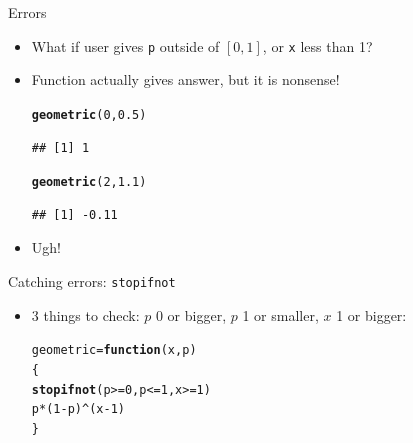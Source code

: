 \documentclass[unknownkeysallowed]{beamer}\usepackage[]{graphicx}\usepackage[]{color}
\makeatletter
\newcommand{\hlnum}[1]{\textcolor[rgb]{0.686,0.059,0.569}{#1}}%
\newcommand{\hlopt}[1]{\textcolor[rgb]{0,0,0}{#1}}%
\newcommand{\hlstd}[1]{\textcolor[rgb]{0.345,0.345,0.345}{#1}}%
\newcommand{\hlkwa}[1]{\textcolor[rgb]{0.161,0.373,0.58}{\textbf{#1}}}%
\newcommand{\hlkwb}[1]{\textcolor[rgb]{0.69,0.353,0.396}{#1}}%
\newcommand{\hlkwc}[1]{\textcolor[rgb]{0.333,0.667,0.333}{#1}}%
\newcommand{\hlkwd}[1]{\textcolor[rgb]{0.737,0.353,0.396}{\textbf{#1}}}%
\newenvironment{kframe}{%
 \def\at@end@of@kframe{}%
 \ifinner\ifhmode%
  \def\at@end@of@kframe{\end{minipage}}%
  \begin{minipage}{\columnwidth}%
 \fi\fi%
 \def\FrameCommand##1{\hskip\@totalleftmargin \hskip-\fboxsep
 \colorbox{shadecolor}{##1}\hskip-\fboxsep
     \hskip-\linewidth \hskip-\@totalleftmargin \hskip\columnwidth}%
 \MakeFramed {\advance\hsize-\width
   \@totalleftmargin\z@ \linewidth\hsize
   \@setminipage}}%
 {\par\unskip\endMakeFramed%
 \at@end@of@kframe}
\newenvironment{knitrout}{}{} %
\makeatother
\begin{document}
\begin{frame}[fragile]{Errors}

  \begin{itemize}
\item What if user gives \texttt{p} outside of $[0,1]$, or \texttt{x}
  less than 1?
  \item Function actually gives answer, but it is nonsense!
\begin{knitrout}
\color{fgcolor}\begin{kframe}
\begin{alltt}
\hlkwd{geometric}\hlstd{(}\hlnum{0}\hlstd{,}\hlnum{0.5}\hlstd{)}
\end{alltt}
\begin{verbatim}
## [1] 1
\end{verbatim}
\begin{alltt}
\hlkwd{geometric}\hlstd{(}\hlnum{2}\hlstd{,}\hlnum{1.1}\hlstd{)}
\end{alltt}
\begin{verbatim}
## [1] -0.11
\end{verbatim}
\end{kframe}
\end{knitrout}

\item Ugh!

  \end{itemize}
  
\end{frame}

\begin{frame}[fragile]{Catching errors: \texttt{stopifnot}}

  \begin{itemize}
  \item 3 things to check: $p$ 0 or bigger, $p$ 1 or smaller, $x$ 1 or
    bigger:
\begin{knitrout}
\color{fgcolor}\begin{kframe}
\begin{alltt}
\hlstd{geometric}\hlkwb{=}\hlkwa{function}\hlstd{(}\hlkwc{x}\hlstd{,}\hlkwc{p}\hlstd{)}
\hlstd{\{}
  \hlkwd{stopifnot}\hlstd{(p}\hlopt{>=}\hlnum{0}\hlstd{,p}\hlopt{<=}\hlnum{1}\hlstd{,x}\hlopt{>=}\hlnum{1}\hlstd{)}
  \hlstd{p}\hlopt{*}\hlstd{(}\hlnum{1}\hlopt{-}\hlstd{p)}\hlopt{^}\hlstd{(x}\hlopt{-}\hlnum{1}\hlstd{)}
\hlstd{\}}
\end{alltt}
\end{kframe}
\end{knitrout}


  \end{itemize}
  
\end{frame}
\end{document}
